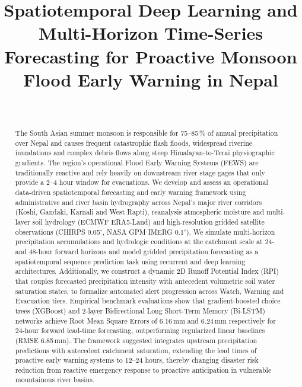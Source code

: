 \documentclass[journal]{IEEEtran}
\begin{document}
\title{Spatiotemporal Deep Learning and Multi-Horizon Time-Series Forecasting for Proactive Monsoon Flood Early Warning in Nepal}

\author{
 \\
}

\maketitle

\begin{abstract}
The South Asian summer monsoon is responsible for 75--85\,\% of annual precipitation over Nepal and causes frequent catastrophic flash floods, widespread riverine inundations and complex debris flows along steep Himalayan-to-Terai physiographic gradients. The region's operational Flood Early Warning Systems (FEWS) are traditionally reactive and rely heavily on downstream river stage gages that only provide a 2--4 hour window for evacuations. We develop and assess an operational data-driven spatiotemporal forecasting and early warning framework using administrative and river basin hydrography across Nepal's major river corridors (Koshi, Gandaki, Karnali and West Rapti), reanalysis atmospheric moisture and multi-layer soil hydrology (ECMWF ERA5-Land) and high-resolution gridded satellite observations (CHIRPS 0.05$^\circ$, NASA GPM IMERG 0.1$^\circ$). We simulate multi-horizon precipitation accumulations and hydrologic conditions at the catchment scale at 24- and 48-hour forward horizons and model gridded precipitation forecasting as a spatiotemporal sequence prediction task using recurrent and deep learning architectures. Additionally, we construct a dynamic 2D Runoff Potential Index (RPI) that couples forecasted precipitation intensity with antecedent volumetric soil water saturation states, to formalize automated alert progression across Watch, Warning and Evacuation tiers. Empirical benchmark evaluations show that gradient-boosted choice trees (XGBoost) and 2-layer Bidirectional Long Short-Term Memory (Bi-LSTM) networks achieve Root Mean Square Errors of 6.16\,mm and 6.24\,mm respectively for 24-hour forward lead-time forecasting, outperforming regularized linear baselines (RMSE 6.85\,mm). The framework suggested integrates upstream precipitation predictions with antecedent catchment saturation, extending the lead times of proactive early warning systems to 12--24 hours, thereby changing disaster risk reduction from reactive emergency response to proactive anticipation in vulnerable mountainous river basins.
\end{abstract}
\end{document}
